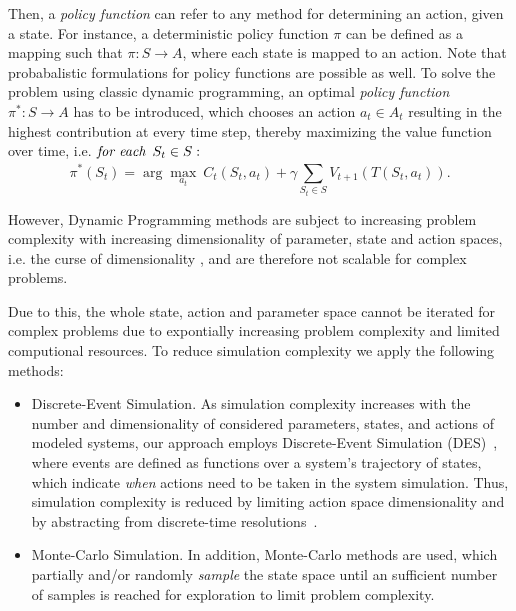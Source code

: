 \documentclass[a4paper,twoside]{article}
\begin{document}
	Then, a \textit{policy function} can refer to any method for determining an action, given a state. For instance, a deterministic policy function $\pi$ can be defined as a mapping such that $\pi : S \to A$, where each state is mapped to an action. Note that probabalistic formulations for policy functions are possible as well.
	To solve the problem using classic dynamic programming, an optimal \textit{policy function} $\pi^* : S \to A$ has to be introduced, which chooses an action $a_t \in \mathit{A_t}$ resulting in the highest contribution at every time step, thereby maximizing the value function over time, i.e. $\textit{for each} \enskip S_t \in S:$
	\begin{equation}
		\pi^*(S_t) = \arg \max_{a_t}\ C_t(S_t,a_t) + \gamma \sum_{S_t \in S}^{}V_{t+1}(T(S_t,a_t)) \mathrm{.}
	\end{equation}
	
	However, Dynamic Programming methods are subject to increasing problem complexity with increasing dimensionality of parameter, state and action spaces, i.e. the curse of dimensionality \cite{bellman_dynamic_1957}, and are therefore not scalable for complex problems.
	
	Due to this, the whole state, action and parameter space cannot be iterated for complex problems due to expontially increasing problem complexity and limited computional resources. 
	To reduce simulation complexity we apply the following methods:

\begin{itemize}
	\item Discrete-Event Simulation. As simulation complexity increases with the number and dimensionality of considered parameters, states, and actions of modeled systems, our approach employs Discrete-Event Simulation (DES)~\cite{fishman2001discrete}, where events are defined as functions over a system's trajectory of states, which indicate \textit{when} actions need to be taken in the system simulation.	Thus, simulation complexity is reduced by limiting action space dimensionality and by abstracting from discrete-time resolutions~\cite{ascher2023discrete}.
	\item Monte-Carlo Simulation. In addition, Monte-Carlo methods are used, which partially and/or randomly \textit{sample} the state space until an sufficient number of samples is reached for exploration to limit problem complexity. 
\end{itemize}
\end{document}
